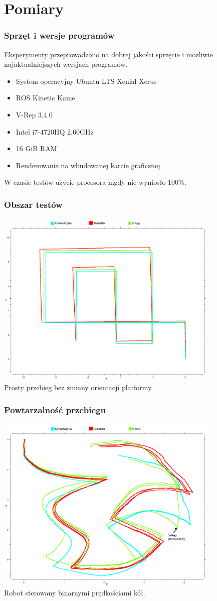 \documentclass{beamer}
\begin{document}
	\section{Pomiary}
	\begin{frame}
		\frametitle{Sprzęt i wersje programów}
		Eksperymenty przeprowadzono na dobrej jakości sprzęcie i możliwie najaktualniejszych wersjach programów.
		\begin{itemize}
			\item System operacyjny Ubuntu LTS Xenial Xerus
			\item ROS Kinetic Kame
			\item V-Rep 3.4.0
		\end{itemize}
		\begin{itemize}
			\item Intel i7-4720HQ 2.60GHz
			\item 16 GiB RAM
			\item Renderowanie na wbudowanej karcie graficznej
		\end{itemize}
		W czasie testów użycie procesora nigdy nie wyniosło 100\%.
	\end{frame}
	\begin{frame}
		\frametitle{Obszar testów}
		\centering
		\includegraphics[width=0.8\textwidth]{graphics/track_1.png} \\
		Prosty przebieg bez zmiany orientacji platformy.
	\end{frame}
	\begin{frame}
		\frametitle{Powtarzalność przebiegu}
		\centering
		\includegraphics[width=0.8\textwidth]{graphics/bag_3.png} \\
		Robot sterowany binarnymi prędkościami kół.
	\end{frame}
\end{document}
